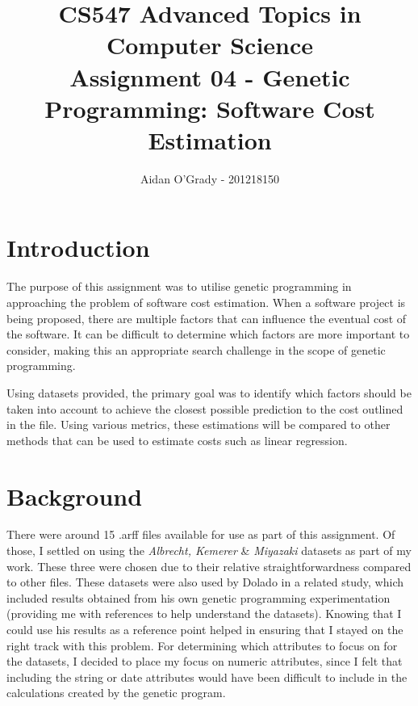 \documentclass[11pt, a4paper]{article}
\begin{document}
\title{CS547 Advanced Topics in Computer Science\\
\large{Assignment 04 - Genetic Programming: Software Cost Estimation}}
\author{Aidan O'Grady - 201218150}
\date{}
\maketitle
\section{Introduction} %
\label{sec:introduction}
The purpose of this assignment was to utilise genetic programming in approaching
the problem of software cost estimation. When a software project is being
proposed, there are multiple factors that can influence the eventual cost of the
software. It can be difficult to determine which factors are more important to
consider, making this an appropriate search challenge in the scope of genetic
programming.

Using datasets provided, the primary goal was to identify which factors should
be taken into account to achieve the closest possible prediction to the cost
outlined in the file. Using various metrics, these estimations will be compared
to other methods that can be used to estimate costs such as linear regression.

\section{Background} %
\label{sec:background}
There were around 15 .arff files available for use as part of this assignment.
Of those, I settled on using the \emph{Albrecht, Kemerer} \& \emph{Miyazaki}
datasets as part of my work. These three were chosen due to their relative
straightforwardness compared to other files. These datasets were also used by
Dolado \cite{Dolado200161} in a related study, which included results obtained
from his own genetic programming experimentation (providing me with references
to help understand the datasets). Knowing that I could use his results as a
reference point helped in ensuring that I stayed on the right track with this
problem. For determining which attributes to focus on for the datasets, I
decided to place my focus on numeric attributes, since I felt that including
the string or date attributes would have been difficult to include in the
calculations created by the genetic program.
\end{document}
